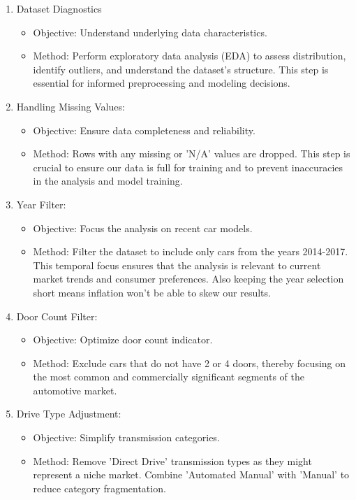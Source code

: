 \documentclass{article}
\begin{document}
\begin{enumerate}

    \item Dataset Diagnostics
    \begin{itemize}
        \item Objective: Understand underlying data characteristics.
        \item Method: Perform exploratory data analysis (EDA) to assess distribution, identify outliers, and understand the dataset’s structure. This step is essential for informed preprocessing and modeling decisions.
    \end{itemize}

    \item Handling Missing Values:
    \begin{itemize}
        \item Objective: Ensure data completeness and reliability.
        \item Method: Rows with any missing or 'N/A' values are dropped. This step is crucial to ensure our data is full for training and to prevent inaccuracies in the analysis and model training.
    \end{itemize}
    
    \item Year Filter:
    \begin{itemize}
        \item Objective: Focus the analysis on recent car models.
        \item Method: Filter the dataset to include only cars from the years 2014-2017. This temporal focus ensures that the analysis is relevant to current market trends and consumer preferences. Also keeping the year selection short means inflation won't be able to skew our results.
    \end{itemize}

    \item Door Count Filter:
    \begin{itemize}
        \item Objective: Optimize door count indicator.
        \item Method: Exclude cars that do not have 2 or 4 doors, thereby focusing on the most common and commercially significant segments of the automotive market.
    \end{itemize}
    
    \item Drive Type Adjustment:
    \begin{itemize}
        \item Objective: Simplify transmission categories.
        \item Method: Remove 'Direct Drive' transmission types as they might represent a niche market. Combine 'Automated Manual' with 'Manual' to reduce category fragmentation.
    \end{itemize}
    

\end{enumerate}
\end{document}
